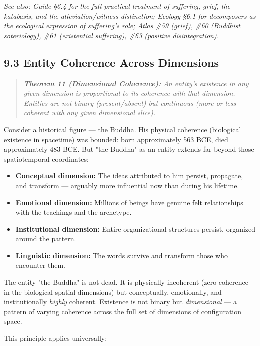 \textit{See also: Guide §6.4 for the full practical treatment of suffering, grief, the katabasis, and the alleviation/witness distinction; Ecology §6.1 for decomposers as the ecological expression of suffering's role; Atlas \#59 (grief), \#60 (Buddhist soteriology), \#61 (existential suffering), \#63 (positive disintegration).}


\subsection*{9.3 Entity Coherence Across Dimensions}


\begin{quote}
\itshape
\textbf{Theorem 11 (Dimensional Coherence):} \textit{An entity's existence in any given dimension is proportional to its coherence with that dimension. Entities are not binary (present/absent) but continuous (more or less coherent with any given dimensional slice).}
\end{quote}


Consider a historical figure — the Buddha. His physical coherence (biological existence in spacetime) was bounded: born approximately 563 BCE, died approximately 483 BCE. But "the Buddha" as an entity extends far beyond those spatiotemporal coordinates:


\begin{itemize}[nosep,leftmargin=*]
  \item \textbf{Conceptual dimension:} The ideas attributed to him persist, propagate, and transform — arguably more influential now than during his lifetime.
  \item \textbf{Emotional dimension:} Millions of beings have genuine felt relationships with the teachings and the archetype.
  \item \textbf{Institutional dimension:} Entire organizational structures persist, organized around the pattern.
  \item \textbf{Linguistic dimension:} The words survive and transform those who encounter them.
\end{itemize}


The entity "the Buddha" is not dead. It is physically incoherent (zero coherence in the biological-spatial dimensions) but conceptually, emotionally, and institutionally \textit{highly} coherent. Existence is not binary but \textit{dimensional} — a pattern of varying coherence across the full set of dimensions of configuration space.


This principle applies universally:


